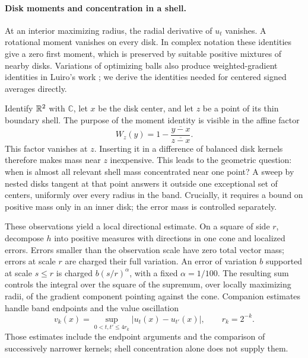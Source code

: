 \paragraph{Disk moments and concentration in a shell.}
At an interior maximizing radius, the radial derivative of $u_t$
vanishes. A rotational moment vanishes on every disk. In complex
notation these identities give a zero first moment, which is
preserved by suitable positive mixtures of nearby disks. Variations
of optimizing balls also produce weighted-gradient identities in
Luiro's work \cite[Lemmas~2.2 and~2.4]{Luiro2018Radial}; we derive
the identities needed for centered signed averages directly.

Identify $\mathbb R^2$ with $\mathbb C$, let $x$ be the disk center, and let
$z$ be a point of its thin boundary shell. The purpose of the moment
identity is visible in the affine factor
\[
 W_z(y)=1-\frac{\overline{y-x}}{\overline{z-x}}.
\]
This factor vanishes at $z$. Inserting it in a difference of balanced
disk kernels therefore makes mass near $z$ inexpensive. This leads
to the geometric question: when is almost all relevant shell mass
concentrated near one point? A sweep by nested disks tangent at that
point answers it outside one exceptional set of centers, uniformly
over every radius in the band. Crucially, it requires a bound on
positive mass only in an inner disk; the error mass is controlled
separately.

These observations yield a local directional estimate. On a square
of side $r$, decompose $h$ into positive measures with directions
in one cone and localized errors. Errors smaller than the
observation scale have zero total vector mass; errors at scale
$r$ are charged their full variation. An
error of variation $b$ supported at scale $s\le r$ is charged
$b(s/r)^\alpha$, with a fixed $\alpha=1/100$. The resulting sum
controls the integral over the square of the supremum, over locally
maximizing radii, of the gradient component pointing against the
cone. Companion estimates handle band endpoints and the value
oscillation
\[
 v_k(x)=\sup_{0<t,t'\le4r_k}|u_t(x)-u_{t'}(x)|,
 \qquad r_k=2^{-k}.
\]
Those estimates include the endpoint arguments and the comparison
of successively narrower kernels; shell concentration alone does
not supply them.


